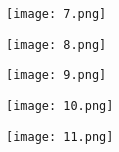 \begin{figure}[h!]
	\centering
	\texttt{[image: 7.png]}
	\label{fig:lat_acc_val}
\end{figure}


\begin{figure}[h!]
	\centering
	\texttt{[image: 8.png]}
	\label{fig:lat_acc_val}
\end{figure}


\begin{figure}[h!]
	\centering
	\texttt{[image: 9.png]}
	\label{fig:lat_acc_val}
\end{figure}


\begin{figure}[h!]
	\centering
	\texttt{[image: 10.png]}
	\label{fig:lat_acc_val}
\end{figure}


\begin{figure}[h!]
	\centering
	\texttt{[image: 11.png]}
	\label{fig:lat_acc_val}
\end{figure}










